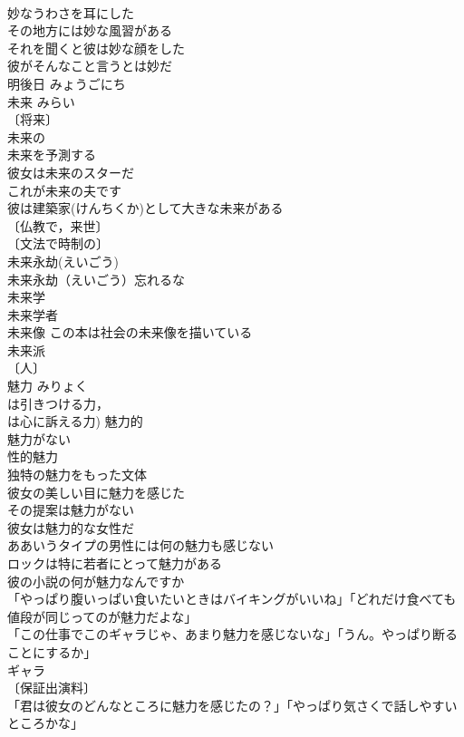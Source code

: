 \documentclass[8pt]{extreport}
\begin{document}
\begin{CJK}{UTF8}{min}
\\	妙なうわさを耳にした 
\\	その地方には妙な風習がある 
\\	それを聞くと彼は妙な顔をした 
\\	彼がそんなこと言うとは妙だ 
\\	明後日	みょうごにち	
\\	未来	みらい	
\\	〔将来〕
\\	未来の 
\\	未来を予測する 
\\	彼女は未来のスターだ 
\\	これが未来の夫です 
\\	彼は建築家(けんちくか)として大きな未来がある 
\\	〔仏教で，来世〕
\\	〔文法で時制の〕
\\	未来永劫(えいごう) 
\\	未来永劫（えいごう）忘れるな 
\\	未来学 
\\	未来学者 
\\	未来像 この本は社会の未来像を描いている 
\\	未来派 
\\	〔人〕
\\	魅力	みりょく	
\\	は引きつける力，
\\	は心に訴える力) 魅力的 
\\	魅力がない 
\\	性的魅力 
\\	独特の魅力をもった文体 
\\	彼女の美しい目に魅力を感じた 
\\	その提案は魅力がない 
\\	彼女は魅力的な女性だ 
\\	ああいうタイプの男性には何の魅力も感じない 
\\	ロックは特に若者にとって魅力がある 
\\	彼の小説の何が魅力なんですか 
\\	「やっぱり腹いっぱい食いたいときはバイキングがいいね」「どれだけ食べても値段が同じってのが魅力だよな」 
\\	「この仕事でこのギャラじゃ、あまり魅力を感じないな」「うん。やっぱり断ることにするか」 
\\	ギャラ　
\\	〔保証出演料〕
\\	「君は彼女のどんなところに魅力を感じたの？」「やっぱり気さくで話しやすいところかな」 

\end{CJK}
\end{document}
